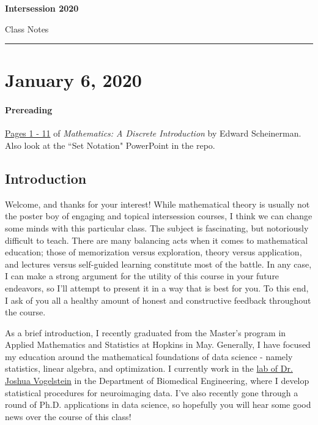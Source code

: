 \documentclass[11pt]{article}
\theoremstyle{plain}
\theoremstyle{definition}
\theoremstyle{remark}
\begin{document}

 \hfill {\bf Intersession 2020}

 \hfill 
{Class Notes}

\noindent \rule[0.1in]{\textwidth}{0.4pt}


\section{January 6, 2020}

\paragraph{Prereading} \href{https://drive.google.com/drive/folders/1T_M-dvYE4leOSmpKt2eGYOvPRch_SDpK?usp=sharing}{Pages 1 - 11} of {\it Mathematics: A Discrete Introduction} by Edward Scheinerman. Also look at the ``Set Notation" PowerPoint in the repo.

\subsection{Introduction}
Welcome, and thanks for your interest! While mathematical theory is usually not the poster boy of engaging and topical intersession courses, I think we can change some minds with this particular class. The subject is fascinating, but notoriously difficult to teach. There are many balancing acts when it comes to mathematical education; those of memorization versus exploration, theory versus application, and lectures versus self-guided learning constitute most of the battle. In any case, I can make a strong argument for the utility of this course in your future endeavors, so I'll attempt to present it in a way that is best for you. To this end, I ask of you all a healthy amount of honest and constructive feedback throughout the course.

As a brief introduction, I recently graduated from the Master's program in Applied Mathematics and Statistics at Hopkins in May. Generally, I have focused my education around the mathematical foundations of data science - namely statistics, linear algebra, and optimization. I currently work in the \href{https://neurodata.io/}{lab of Dr. Joshua Vogelstein} in the Department of Biomedical Engineering, where I develop statistical procedures for neuroimaging data. I've also recently gone through a round of Ph.D. applications in data science, so hopefully you will hear some good news over the course of this class!
\end{document}
